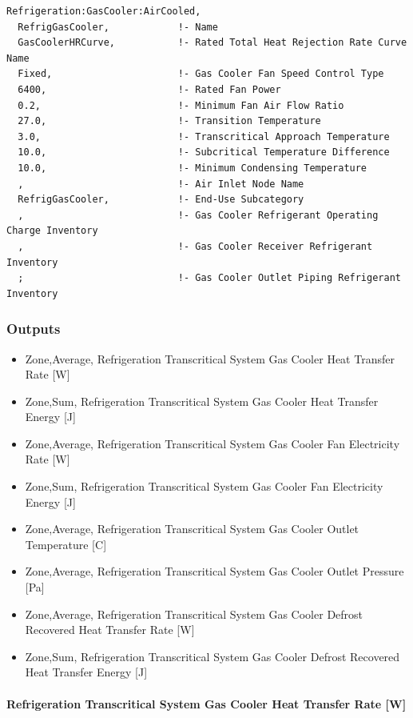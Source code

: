 \begin{lstlisting}
Refrigeration:GasCooler:AirCooled,
  RefrigGasCooler,            !- Name
  GasCoolerHRCurve,           !- Rated Total Heat Rejection Rate Curve Name
  Fixed,                      !- Gas Cooler Fan Speed Control Type
  6400,                       !- Rated Fan Power
  0.2,                        !- Minimum Fan Air Flow Ratio
  27.0,                       !- Transition Temperature
  3.0,                        !- Transcritical Approach Temperature
  10.0,                       !- Subcritical Temperature Difference
  10.0,                       !- Minimum Condensing Temperature
  ,                           !- Air Inlet Node Name
  RefrigGasCooler,            !- End-Use Subcategory
  ,                           !- Gas Cooler Refrigerant Operating Charge Inventory
  ,                           !- Gas Cooler Receiver Refrigerant Inventory
  ;                           !- Gas Cooler Outlet Piping Refrigerant Inventory
\end{lstlisting}

\subsubsection{Outputs}\label{outputs-10-006}

\begin{itemize}
\item
  Zone,Average, Refrigeration Transcritical System Gas Cooler Heat Transfer Rate {[}W{]}
\item
  Zone,Sum, Refrigeration Transcritical System Gas Cooler Heat Transfer Energy {[}J{]}
\item
  Zone,Average, Refrigeration Transcritical System Gas Cooler Fan Electricity Rate {[}W{]}
\item
  Zone,Sum, Refrigeration Transcritical System Gas Cooler Fan Electricity Energy {[}J{]}
\item
  Zone,Average, Refrigeration Transcritical System Gas Cooler Outlet Temperature {[}C{]}
\item
  Zone,Average, Refrigeration Transcritical System Gas Cooler Outlet Pressure {[}Pa{]}
\item
  Zone,Average, Refrigeration Transcritical System Gas Cooler Defrost Recovered Heat Transfer Rate {[}W{]}
\item
  Zone,Sum, Refrigeration Transcritical System Gas Cooler Defrost Recovered Heat Transfer Energy {[}J{]}
\end{itemize}

\paragraph{Refrigeration Transcritical System Gas Cooler Heat Transfer Rate {[}W{]}}\label{refrigeration-transcritical-system-gas-cooler-heat-transfer-rate-w}

